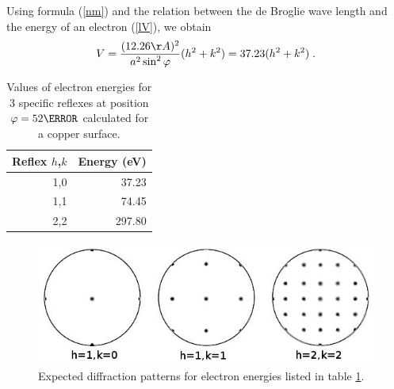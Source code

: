 \documentclass[a4paper]{scrartcl}
\numberwithin{equation}{section}
\numberwithin{figure}{section}
\numberwithin{table}{section}
\newcommand{\eq}[2]{\begin{equation}#1\label{#2}\end{equation}}
\newcommand{\Formel}[1]{(\ref{#1})}
\begin{document}
Using formula \Formel{nm} and the relation between the de Broglie wave length and the energy of an electron \Formel{lV}, we obtain
\eq{ V =\frac{(12.26 \AA)^2}{a^2 \sin^2 \varphi} (h^2+k^2) = 37.23 (h^2 +k^2) \; .}{}
\FloatBarrier
\begin{table}[!h]
\centering
\begin{tabular}{rr}
\toprule
Reflex $h$,$k$ & Energy (eV) \\
\midrule
1,0 & 37.23 \\
1,1 & 74.45 \\
2,2 & 297.80 \\
 \bottomrule
\end{tabular}
\caption{\small Values of electron energies for 3 specific reflexes at position $\varphi =52\degree$ calculated for a copper surface. }
\label{kll}
\end{table}

\begin{figure}
  \centering
   	\includegraphics[width=0.7\linewidth]{pic/52.jpeg}

 \caption{\small Expected diffraction patterns for electron energies listed in table \ref{kll}.}
        \label{fig:bragg}
\end{figure}
\FloatBarrier
\end{document}
